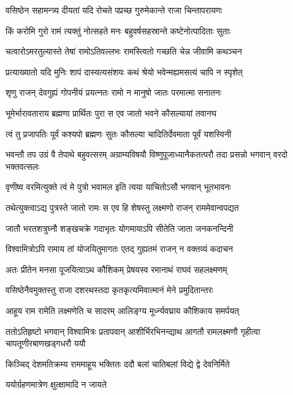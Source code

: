 \twolineshloka
{वसिष्ठेन सहामन्त्र्य दीयतां यदि रोचते}
{पप्रच्छ गुरुमेकान्ते राजा चिन्तापरायणः} %

\twolineshloka
{किं करोमि गुरो रामं त्यक्तुं नोत्सहते मनः}
{बहुवर्षसहस्रान्ते कष्टेनोत्पादिताः सुताः} %

\twolineshloka
{चत्वारोऽमरतुल्यास्ते तेषां रामोऽतिवल्लभः}
{रामस्त्वितो गच्छति चेन्न जीवामि कथञ्चन} %

\twolineshloka
{प्रत्याख्यातो यदि मुनिः शापं दास्यत्यसंशयः}
{कथं श्रेयो भवेन्मह्यमसत्यं चापि न स्पृशेत्} %


\twolineshloka
{शृणु राजन् देवगुह्यं गोपनीयं प्रयत्नतः}
{रामो न मानुषो जातः परमात्मा सनातनः} %

\twolineshloka
{भूमेर्भारावताराय ब्रह्मणा प्रार्थितः पुरा}
{स एव जातो भवने कौसल्यायां तवानघ} %

\twolineshloka
{त्वं तु प्रजापतिः पूर्वं कश्यपो ब्रह्मणः सुतः}
{कौसल्या चादितिर्देवमाता पूर्वं यशस्विनी} %

\threelineshloka
{भवन्तौ तप उग्रं वै तेपाथे बहुवत्सरम्}
{अग्राम्यविषयौ विष्णुपूजाध्यानैकतत्परौ}
{तदा प्रसन्नो भगवान् वरदो भक्तवत्सलः} %

\twolineshloka
{वृणीष्व वरमित्युक्ते त्वं मे पुत्रो भवामल}
{इति त्वया याचितोऽसौ भगवान् भूतभावनः} %

\twolineshloka
{तथेत्युक्त्वाऽद्य पुत्रस्ते जातो रामः स एव हि}
{शेषस्तु लक्ष्मणो राजन् राममेवान्वपद्यत} %

\twolineshloka
{जातौ भरतशत्रुघ्नौ शङ्खचक्रे गदाभृतः}
{योगमायाऽपि सीतेति जाता जनकनन्दिनी} %

\twolineshloka
{विश्वामित्रोऽपि रामाय तां योजयितुमागतः}
{एतद् गुह्यतमं राजन् न वक्तव्यं कदाचन} %

\twolineshloka
{अतः प्रीतेन मनसा पूजयित्वाऽथ कौशिकम्}
{प्रेषयस्व रमानाथं राघवं सहलक्ष्मणम्} %

\twolineshloka
{वसिष्ठेनैवमुक्तस्तु राजा दशरथस्तदा}
{कृतकृत्यमिवात्मानं मेने प्रमुदितान्तरः} %

\twolineshloka
{आहूय राम रामेति लक्ष्मणेति च सादरम्}
{आलिङ्ग्य मूर्ध्न्यवघ्राय कौशिकाय समर्पयत्} %

\threelineshloka
{ततोऽतिहृष्टो भगवान् विश्वामित्रः प्रतापवान्}
{आशीर्भिरभिनन्द्याथ आगतौ रामलक्ष्मणौ}
{गृहीत्वा चापतूणीरबाणखड्गधरौ ययौ} %

\twolineshloka
{किञ्चिद् देशमतिक्रम्य राममाहूय भक्तितः}
{ददौ बलां चातिबलां विद्ये द्वे देवनिर्मिते} %

\onelineshloka
{ययोर्ग्रहणमात्रेण क्षुत्क्षामादि न जायते} %

